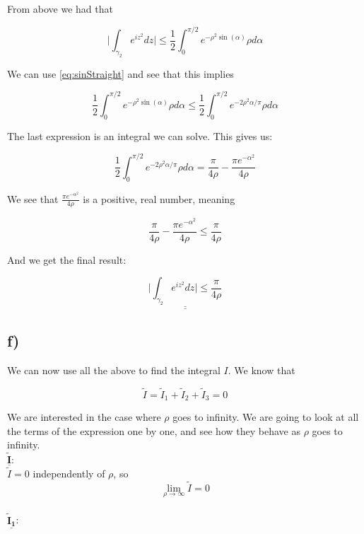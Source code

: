 \documentclass[a4paper,norsk, 10pt]{article}
\begin{document}
From above we had that 

$$
\big| \int_{\gamma_2}e^{iz^2} dz \big| \leq \frac{1}{2}\int_0^{\pi/2} e^{-\rho^2 \sin(\alpha)}\rho d\alpha
$$

We can use \ref{eq:sinStraight} and see that this implies 

$$
\frac{1}{2}\int_0^{\pi/2} e^{-\rho^2 \sin(\alpha)}\rho d\alpha \leq \frac{1}{2}\int_0^{\pi/2} e^{-2\rho^2 \alpha/\pi}\rho d\alpha
$$

The last expression is an integral we can solve. This gives us:

$$
\frac{1}{2}\int_0^{\pi/2} e^{-2\rho^2 \alpha/\pi}\rho d\alpha = \frac{\pi}{4\rho} - \frac{\pi e^{-\alpha^2}}{4\rho}
$$

We see that $\frac{\pi e^{-\alpha^2}}{4\rho}$ is a positive, real number, meaning 

$$
\frac{\pi}{4\rho} - \frac{\pi e^{-\alpha^2}}{4\rho} \leq  \frac{\pi}{4\rho}
$$

And we get the final result:

\begin{equation}
\underline{\underline{\big| \int_{\gamma_2}e^{iz^2} dz \big| \leq \frac{\pi}{4\rho}}}
\label{eq:I2}
\end{equation}



\subsection*{f)}

We can now use all the above to find the integral $I$. We know that

$$
\tilde{I} = \tilde{I}_1 + \tilde{I}_2 + \tilde{I}_3 = 0
$$

We are interested in the case where $\rho$ goes to infinity. We are going to look at all the terms of the expression one by one, and see how they behave as $\rho$ goes to infinity.\\

$\underline{\mathbf{\tilde{I}}}$:\\

$\tilde{I} = 0$ independently of $\rho$, so
\begin{equation}
\lim_{\rho \rightarrow \infty} \tilde{I} = 0
\label{eq:IrhoInf}
\end{equation}\\

$\underline{\mathbf{\tilde{I}_1}}$:\\
\end{document}
